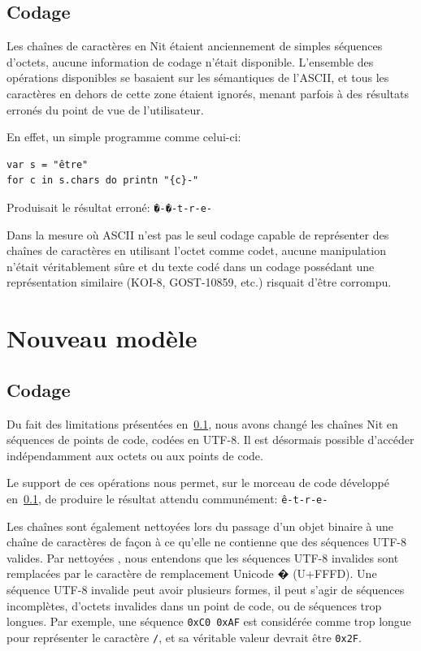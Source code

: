 \subsection{Codage}\label{codage_ancien}

Les chaînes de caractères en Nit étaient anciennement de simples séquences d'octets, aucune
information de codage n'était disponible.
L'ensemble des opérations disponibles se basaient sur les sémantiques de l'ASCII, et tous les caractères
en dehors de cette zone étaient ignorés, menant parfois à des résultats erronés du point de vue de
l'utilisateur.

En effet, un simple programme comme celui-ci:

\begin{verbatim}
var s = "être"
for c in s.chars do printn "{c}-"
\end{verbatim}

Produisait le résultat erroné: \texttt{{�}-{�}-t-r-e-}

Dans la mesure où ASCII n'est pas le seul codage capable de représenter des chaînes de caractères en
utilisant l'octet comme codet, aucune manipulation n'était véritablement sûre et du texte codé dans un
codage possédant une représentation similaire (KOI-8, GOST-10859, etc.) risquait d'être corrompu.

\section{Nouveau modèle}

\subsection{Codage}

Du fait des limitations présentées en~\ref{codage_ancien}, nous avons changé les chaînes Nit
en séquences de points de code, codées en UTF-8.
Il est désormais possible d'accéder indépendamment aux octets ou aux points de code.

Le support de ces opérations nous permet, sur le morceau de code développé en~\ref{codage_ancien},
de produire le résultat attendu communément: \texttt{ê-t-r-e-}

Les chaînes sont également nettoyées lors du passage d'un objet binaire à une chaîne de caractères de façon
à ce qu'elle ne contienne que des séquences UTF-8 valides.
Par \og nettoyées \fg{}, nous entendons que les séquences UTF-8 invalides sont remplacées par le
caractère de remplacement Unicode {�} (U+FFFD).
Une séquence UTF-8 invalide peut avoir plusieurs formes, il peut s'agir de séquences incomplètes,
d'octets invalides dans un point de code, ou de séquences trop longues.
Par exemple, une séquence \texttt{0xC0 0xAF} est considérée comme trop longue pour représenter
le caractère \texttt{/}, et sa véritable valeur devrait être \texttt{0x2F}.

